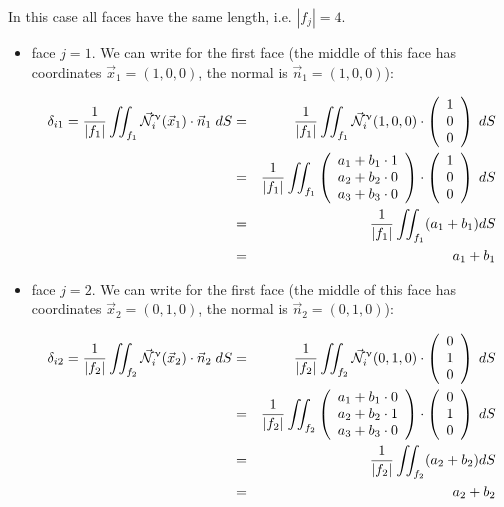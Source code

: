 In this case all faces have the same length, i.e. $|f_j|=4$.

\begin{itemize}
\item face $j=1$. We can write for the first face (the middle of this face has coordinates 
$\vec{x}_1=(1,0,0)$, the normal is $\vec{n}_1=(1,0,0)$):


\begin{eqnarray}
\delta_{i1}=
\frac{1}{|f_1|} \iint_{f_1}
\vec{{\mathcal{N}}}^\upnu_i( \vec{x}_1) \cdot \vec{n}_1 \; dS
&=&\frac{1}{|f_1|} \iint_{f_1} \vec{{\mathcal{N}}}^\upnu_i( 1,0,0) \cdot 
\left(\begin{array}{c} 1 \\ 0  \\ 0\end{array}\right) \; dS \nonumber\\
&=& \frac{1}{|f_1|} \iint_{f_1} 
\left(\begin{array}{c} a_1+b_1\cdot 1 \\ a_2 + b_2 \cdot 0 \\ a_3 + b_3\cdot 0 \end{array}\right)
\cdot \left(\begin{array}{c} 1 \\ 0 \\ 0 \end{array}\right) \; dS \nonumber\\
&=& \frac{1}{|f_1|} \iint_{f_1} (a_1+b_1) dS \nonumber\\
&=& a_1+b_1
\end{eqnarray}


\item face $j=2$. We can write for the first face (the middle of this face has coordinates 
$\vec{x}_2=(0,1,0)$, the normal is $\vec{n}_2=(0,1,0)$):

\begin{eqnarray}
\delta_{i2}=
\frac{1}{|f_2|} \iint_{f_2}
\vec{{\mathcal{N}}}^\upnu_i( \vec{x}_2) \cdot \vec{n}_2 \; dS
&=&\frac{1}{|f_2|} \iint_{f_2} \vec{{\mathcal{N}}}^\upnu_i( 0,1,0) \cdot 
\left(\begin{array}{c} 0 \\ 1  \\ 0\end{array}\right) \; dS \nonumber\\
&=& \frac{1}{|f_2|} \iint_{f_2} 
\left(\begin{array}{c} a_1+b_1\cdot 0 \\ a_2 + b_2 \cdot 1 \\ a_3 + b_3\cdot 0 \end{array}\right)
\cdot \left(\begin{array}{c} 0 \\ 1 \\ 0 \end{array}\right) \; dS \nonumber\\
&=& \frac{1}{|f_2|} \iint_{f_2} (a_2+b_2) dS \nonumber\\
&=& a_2+b_2
\end{eqnarray}



\end{itemize}

